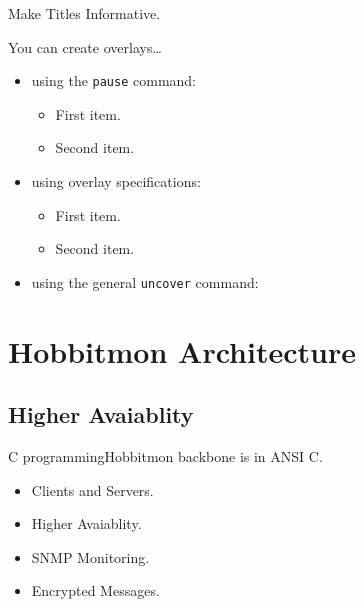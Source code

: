 \documentclass{beamer}
\begin{document}
\begin{frame}{Make Titles Informative.}

  You can create overlays\dots
  \begin{itemize}
  \item using the \texttt{pause} command:
    \begin{itemize}
    \item
      First item.
      \pause
    \item    
      Second item.
    \end{itemize}
  \item
    using overlay specifications:
    \begin{itemize}
    \item<3->
      First item.
    \item<4->
      Second item.
    \end{itemize}
  \item
    using the general \texttt{uncover} command:
    \begin{itemize}
    \end{itemize}
  \end{itemize}
\end{frame}



\section{Hobbitmon Architecture}

\subsection[Clients and Servers]{Higher Avaiablity}

\begin{frame}{C programming}{Hobbitmon backbone is in ANSI C.}

  \begin{itemize}
  \item
    Clients and Servers.
  \item
    Higher Avaiablity.
  \item
    SNMP Monitoring.
  \item
    Encrypted Messages. 
  \end{itemize}
\end{frame}
\end{document}
